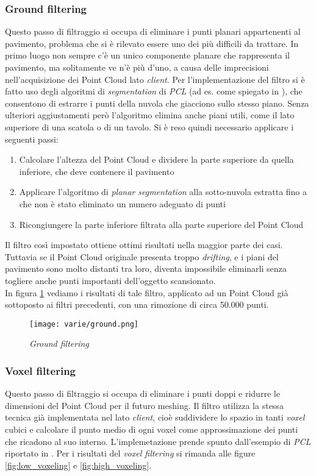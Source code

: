 \subsubsection{Ground filtering}
Questo passo di filtraggio si occupa di eliminare i punti planari appartenenti al pavimento, problema che si è rilevato essere uno dei più difficili da trattare. 
In primo luogo non sempre c'è un unico componente planare che rappresenta il pavimento, ma solitamente ve n'è più d'uno, a causa delle imprecisioni nell'acquisizione dei Point Cloud lato \emph{client}. Per l'implementazione del filtro si è fatto uso degli algoritmi di \emph{segmentation} di \emph{PCL} (ad es. come spiegato in \cite{site:segmentation}), che consentono di estrarre i punti della nuvola che giacciono sullo stesso piano. Senza ulteriori aggiustamenti però l'algoritmo elimina anche piani utili, come il lato superiore di una scatola o di un tavolo.
Si è reso quindi necessario applicare i seguenti passi:
\begin{enumerate}
\item Calcolare l'altezza del Point Cloud e dividere la parte superiore da quella inferiore, che deve contenere il pavimento
\item Applicare l'algoritmo di \emph{planar segmentation} alla sotto-nuvola estratta fino a che non è stato eliminato un numero adeguato di punti
\item Ricongiungere la parte inferiore filtrata alla parte superiore del Point Cloud
\end{enumerate}
Il filtro così impostato ottiene ottimi risultati nella maggior parte dei casi. Tuttavia se il Point Cloud originale presenta troppo  \emph{drifting}, e i piani del pavimento sono molto distanti tra loro, diventa impossibile eliminarli senza togliere anche punti importanti dell'oggetto scansionato.\\
In figura \ref{fig:ground} vediamo i risultati di tale filtro, applicato ad un Point Cloud già sottoposto ai filtri precedenti, con una rimozione di circa 50.000 punti.
\begin{figure}[!h] 
    \centering 
    \texttt{[image: varie/ground.png]} 
    \caption{\emph{Ground filtering}}
    \label{fig:ground}
\end{figure}

\subsubsection{Voxel filtering}
Questo passo di filtraggio si occupa di eliminare i punti doppi e ridurre le dimensioni del Point Cloud per il futuro meshing. Il filtro utilizza la stessa tecnica già implementata nel lato \emph{client}, cioè suddividere lo spazio in tanti \emph{voxel} cubici e  calcolare il punto medio di ogni voxel come approssimazione dei punti che ricadono al suo interno. L'implemetazione prende spunto dall'esempio di \emph{PCL} riportato in \cite{site:voxel}.
Per i risultati del \emph{voxel filtering} si rimanda alle figure \ref{fig:low_voxeling} e \ref{fig:high_voxeling}.
